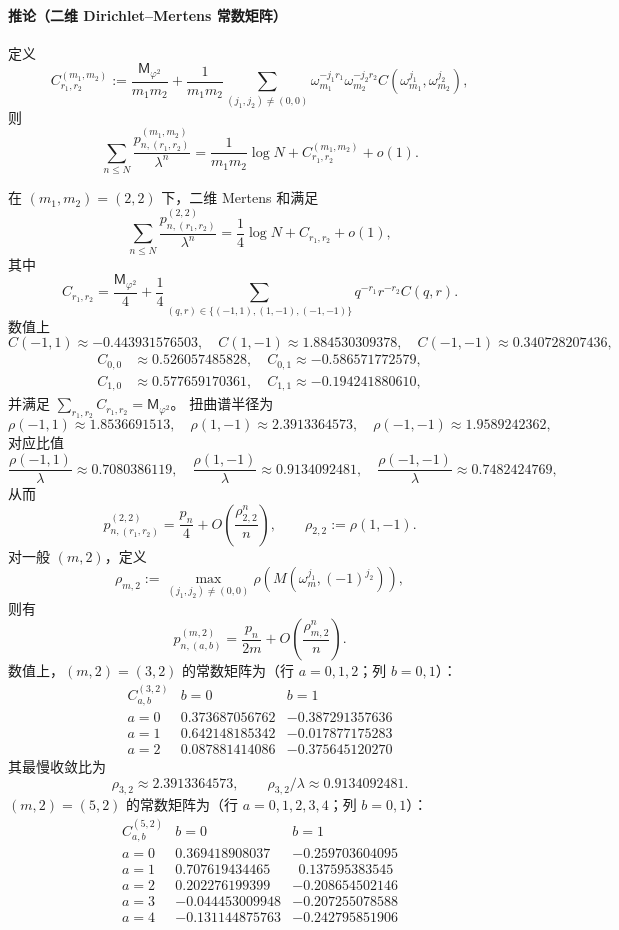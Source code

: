 \paragraph{推论（二维 Dirichlet--Mertens 常数矩阵）}
定义
\[
C_{r_1,r_2}^{(m_1,m_2)}:=\frac{\mathsf{M}_{\varphi^2}}{m_1m_2}
+\frac{1}{m_1m_2}\sum_{(j_1,j_2)\neq(0,0)}\omega_{m_1}^{-j_1r_1}\omega_{m_2}^{-j_2r_2}
C(\omega_{m_1}^{j_1},\omega_{m_2}^{j_2}),
\]
则
\[
\sum_{n\le N}\frac{p_{n,(r_1,r_2)}^{(m_1,m_2)}}{\lambda^n}
=\frac{1}{m_1m_2}\log N+C_{r_1,r_2}^{(m_1,m_2)}+o(1).
\]

在 $(m_1,m_2)=(2,2)$ 下，二维 Mertens 和满足
\[
\sum_{n\le N}\frac{p_{n,(r_1,r_2)}^{(2,2)}}{\lambda^n}
=\frac{1}{4}\log N+C_{r_1,r_2}+o(1),
\]
其中
\[
C_{r_1,r_2}=\frac{\mathsf{M}_{\varphi^2}}{4}
+\frac{1}{4}\sum_{(q,r)\in\{(-1,1),(1,-1),(-1,-1)\}} q^{-r_1}r^{-r_2}C(q,r).
\]
数值上
\[
C(-1,1)\approx -0.443931576503,\quad
C(1,-1)\approx 1.884530309378,\quad
C(-1,-1)\approx 0.340728207436,
\]
\[
\begin{aligned}
C_{0,0}&\approx 0.526057485828,\quad
C_{0,1}\approx -0.586571772579,\\
C_{1,0}&\approx 0.577659170361,\quad
C_{1,1}\approx -0.194241880610,
\end{aligned}
\]
并满足 $\sum_{r_1,r_2}C_{r_1,r_2}=\mathsf{M}_{\varphi^2}$。
扭曲谱半径为
\[
\rho(-1,1)\approx 1.8536691513,\quad
\rho(1,-1)\approx 2.3913364573,\quad
\rho(-1,-1)\approx 1.9589242362,
\]
对应比值
\[
\frac{\rho(-1,1)}{\lambda}\approx 0.7080386119,\quad
\frac{\rho(1,-1)}{\lambda}\approx 0.9134092481,\quad
\frac{\rho(-1,-1)}{\lambda}\approx 0.7482424769,
\]
从而
\[
p_{n,(r_1,r_2)}^{(2,2)}=\frac{p_n}{4}+O\!\left(\frac{\rho_{2,2}^n}{n}\right),
\qquad
\rho_{2,2}:=\rho(1,-1).
\]
对一般 $(m,2)$，定义
\[
\rho_{m,2}:=\max_{(j_1,j_2)\neq(0,0)}\rho\!\left(M(\omega_m^{j_1},(-1)^{j_2})\right),
\]
则有
\[
p_{n,(a,b)}^{(m,2)}=\frac{p_n}{2m}+O\!\left(\frac{\rho_{m,2}^n}{n}\right).
\]
数值上，$(m,2)=(3,2)$ 的常数矩阵为（行 $a=0,1,2$；列 $b=0,1$）：
\[
\begin{array}{c|cc}
C_{a,b}^{(3,2)} & b=0 & b=1\\
\hline
a=0 & 0.373687056762 & -0.387291357636\\
a=1 & 0.642148185342 & -0.017877175283\\
a=2 & 0.087881414086 & -0.375645120270
\end{array}
\]
其最慢收敛比为
\[
\rho_{3,2}\approx 2.3913364573,\qquad \rho_{3,2}/\lambda\approx 0.9134092481.
\]
$(m,2)=(5,2)$ 的常数矩阵为（行 $a=0,1,2,3,4$；列 $b=0,1$）：
\[
\begin{array}{c|cc}
C_{a,b}^{(5,2)} & b=0 & b=1\\
\hline
a=0 & 0.369418908037 & -0.259703604095\\
a=1 & 0.707619434465 & \ \ 0.137595383545\\
a=2 & 0.202276199399 & -0.208654502146\\
a=3 & -0.044453009948 & -0.207255078588\\
a=4 & -0.131144875763 & -0.242795851906
\end{array}
\]
